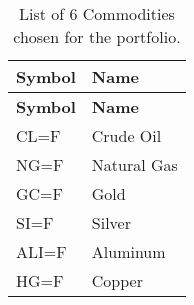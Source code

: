 \begin{longtable}{|l|l|}
\caption{List of 6 Commodities chosen for the portfolio.}
\label{tab:commodities}
\\ 
\hline
\textbf{Symbol} & \textbf{Name}  \\ \midrule
\endfirsthead

\hline
\textbf{Symbol} & \textbf{Name} \\ \midrule
\endhead

\endfoot

\hline
CL=F & Crude Oil \\ \hline
NG=F & Natural Gas \\ \hline
GC=F & Gold \\ \hline
SI=F & Silver \\ \hline
ALI=F & Aluminum \\ \hline
HG=F & Copper \\ \hline
\end{longtable}
